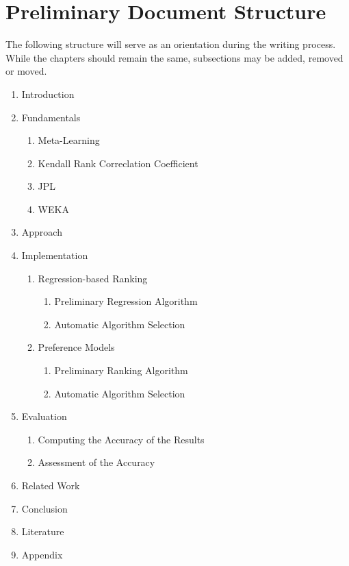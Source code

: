 \documentclass[12pt]{scrartcl}
\begin{document}
\newpage
\section{Preliminary Document Structure}\label{sec:doc-structure}
The following structure will serve as an orientation during the writing process. While the chapters should remain the same, subsections may be added, removed or moved.

\begin{enumerate}
	\item Introduction
	\item Fundamentals
	\begin{enumerate}
		\item Meta-Learning
		\item Kendall Rank Correclation Coefficient
		\item JPL
		\item WEKA
	\end{enumerate}
	\item Approach
	\item Implementation
	\begin{enumerate} 
		\item Regression-based Ranking
		\begin{enumerate}
			\item Preliminary Regression Algorithm
			\item Automatic Algorithm Selection
		\end{enumerate}
		\item Preference Models
		\begin{enumerate}
			\item Preliminary Ranking Algorithm
			\item Automatic Algorithm Selection
		\end{enumerate}
	\end{enumerate}
	\item Evaluation
	\begin{enumerate}
		\item Computing the Accuracy of the Results
		\item Assessment of the Accuracy
	\end{enumerate}
	\item Related Work
	\item Conclusion
	\item Literature
	\item Appendix
\end{enumerate}
\end{document}
